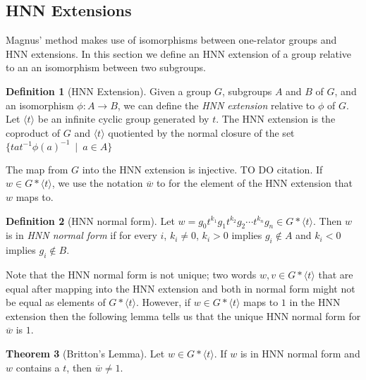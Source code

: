 \documentclass[12pt]{article} %
\theoremstyle{definition}
\newtheorem{theorem}{Theorem}[section]
\theoremstyle{definition}
\theoremstyle{definition}
\theoremstyle{definition}
\theoremstyle{definition}
\newtheorem{defn}[theorem]{Definition}
\theoremstyle{definition}
\begin{document}
\subsection{HNN Extensions}\label{HNN}

Magnus' method makes use of isomorphisms between one-relator groups and HNN extensions.
In this section we define an HNN extension of a group relative to an
an isomorphism between two subgroups.

\begin{defn}[HNN Extension]
  Given a group $G$, subgroups $A$ and $B$ of $G$, and an isomorphism $\phi: A \to B$, we can define
  the \textit{HNN extension} relative to $\phi$ of $G$. Let $\langle t \rangle$ be an infinite cyclic
  group generated by $t$. The HNN extension is the coproduct
  of $G$ and $\langle t \rangle$ quotiented
  by the normal closure of the set $\{ta t^{-1} \phi(a)^{-1} \ \mid \ a \in A\}$
\end{defn}

The map from $G$ into the HNN extension is injective. TO DO citation.
If $w \in G \ast \langle t \rangle$, we use the notation $\overline{w}$ to
for the element of the HNN extension that $w$ maps to.

\begin{defn}[HNN normal form]\label{HNNnormalform}
  Let $w = g_0t^{k_1}g_1t^{k_2}g_2 \cdots t^{k_n}g_n \in G \ast \langle t \rangle$.
  Then $w$ is in \textit{HNN normal form} if for every $i$, $k_i \ne 0$, $k_i > 0$
  implies $g_i \notin A$ and $k_i < 0$ implies $g_i \notin B$.
\end{defn}

Note that the HNN normal form is not unique; two words $w, v \in G \ast \langle t \rangle$
that are equal after mapping into the HNN extension and both in normal form might not be
equal as elements of $G \ast \langle t \rangle$. However, if $w \in G \ast \langle t \rangle $
maps to $1$ in the HNN extension
then the following lemma tells us that the unique HNN normal form for $\overline{w}$ is $1$.

\begin{theorem}[Britton's Lemma]\label{britton}
  Let $w \in G \ast \langle t \rangle$.
  If $w$ is in HNN normal form and $w$ contains a $t$, then
  $\overline{w} \ne 1$.
  \cite{CharlesF.Miller1968OBTA}
\end{theorem}
\end{document}
